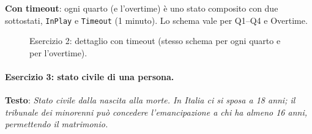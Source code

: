 \documentclass[12pt]{extarticle}
\begin{document}
\noindent \textbf{Con timeout}: ogni quarto (e l'overtime) è uno stato composito con due sottostati, \texttt{InPlay} e \texttt{Timeout} (1 minuto). Lo schema vale per Q1--Q4 e Overtime.

\begin{figure}[H]
    \centering
{}
    \caption{Esercizio 2: dettaglio con timeout (stesso schema per ogni quarto e per l'overtime).}
\end{figure}

\clearpage

\paragraph{Esercizio 3: stato civile di una persona.}
\textbf{Testo}: \textit{Stato civile dalla nascita alla morte. In Italia ci si sposa a 18 anni; il tribunale dei minorenni può concedere l'emancipazione a chi ha almeno 16 anni, permettendo il matrimonio.}
\end{document}
